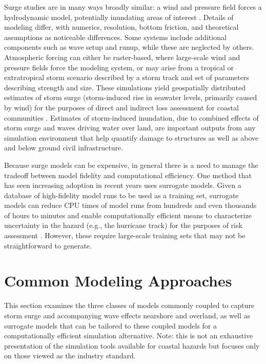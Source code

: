 Surge studies are in many ways broadly similar: a wind and pressure field forces a hydrodynamic model, potentially inundating areas of interest \citep{njcoast2018implementation}. Details of modeling differ, with numerics, resolution, bottom friction, and theoretical assumptions as noticeable differences. Some systems include additional components such as wave setup and runup, while these are neglected by others. Atmospheric forcing can either be raster-based, where large-scale wind and pressure fields force the modeling system, or may arise from a tropical or extratropical storm scenario described by a storm track and set of parameters describing strength and size. These simulations yield geospatially distributed estimates of storm surge (storm-induced rise in seawater levels, primarily caused by wind) for the purposes of direct and indirect loss assessment for coastal communities \citep{jacob2011responding}. Estimates of storm-induced inundation, due to combined effects of storm surge and waves driving water over land, are important outputs from any simulation environment that help quantify damage to structures as well as above and below ground civil infrastructure.

Because surge models can be expensive, in general there is a need to manage the tradeoff between model fidelity and computational efficiency. One method that has seen increasing adoption in recent years uses surrogate models. Given a database of high-fidelity model runs to be used as a training set, surrogate models can reduce CPU times of model runs from hundreds and even thousands of hours to minutes and enable computationally efficient means to characterize uncertainty in the hazard (e.g., the hurricane track) for the purposes of risk assessment \citep{kijewski-correaCyberEye2014}. However, these require large-scale training sets that may not be straightforward to generate. 

\section{Common Modeling Approaches}
\label{sec:storm_surge_methods}

This section examines the three classes of models commonly coupled to capture storm surge and accompanying wave effects nearshore and overland, as well as surrogate models that can be tailored to these coupled models for a computationally efficient simulation alternative. Note: this is not an exhaustive presentation of the simulation tools available for coastal hazards but focuses only on those viewed as the industry standard. 

